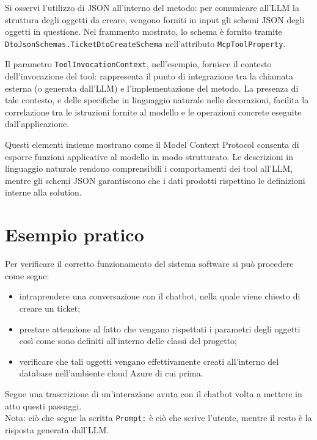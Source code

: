 Si osservi l'utilizzo di JSON all'interno del metodo: per comunicare all'LLM la struttura degli oggetti da creare, vengono forniti in input
gli schemi JSON degli oggetti in questione. Nel frammento mostrato, lo schema è fornito tramite \texttt{DtoJsonSchemas.TicketDtoCreateSchema}
nell'attributo \texttt{McpToolProperty}.

Il parametro \texttt{ToolInvocationContext}, nell'esempio, fornisce il contesto dell'invocazione del tool:
rappresenta il punto di integrazione tra la chiamata esterna (o generata dall'LLM) e l'implementazione del metodo.
La presenza di tale contesto, e delle specifiche in linguaggio naturale nelle decorazioni, facilita la correlazione tra le istruzioni fornite al modello
e le operazioni concrete eseguite dall'applicazione.

Questi elementi insieme mostrano come il Model Context Protocol consenta di esporre funzioni applicative al modello in modo strutturato.
Le descrizioni in linguaggio naturale rendono comprensibili i comportamenti dei tool all'LLM, mentre gli schemi JSON garantiscono che i dati prodotti
rispettino le definizioni interne alla solution.

\section{Esempio pratico}
Per verificare il corretto funzionamento del sistema software si può procedere come segue:
\begin{itemize}
    \item intraprendere una conversazione con il chatbot, nella quale viene chiesto di creare un ticket;
    \item prestare attenzione al fatto che vengano rispettati i parametri degli oggetti così come sono definiti all'interno delle classi del progetto;
    \item verificare che tali oggetti vengano effettivamente creati all'interno del database nell'ambiente cloud Azure di cui prima.
\end{itemize}
Segue una trascrizione di un'interazione avuta con il chatbot volta a mettere in atto questi passaggi. \\
Nota: ciò che segue la scritta \texttt{Prompt:} è ciò che scrive l'utente, mentre il resto è la risposta generata dall'LLM.

